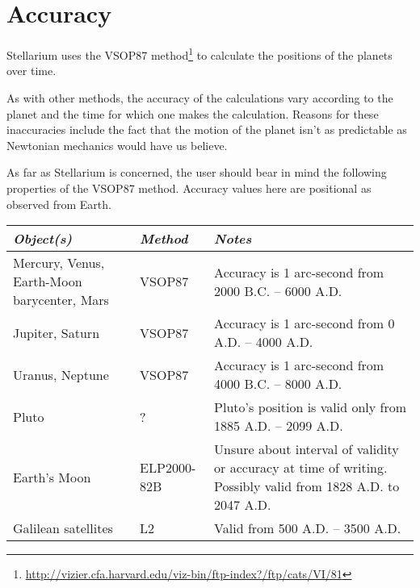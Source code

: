 


\chapter{Accuracy}
\label{ch:Accuracy}
Stellarium uses the VSOP87 \cite{1988A&A...202..309B}
method\footnote{\url{http://vizier.cfa.harvard.edu/viz-bin/ftp-index?/ftp/cats/VI/81}}
to calculate the positions of the planets over time.

As with other methods, the accuracy of the calculations vary according
to the planet and the time for which one makes the calculation. Reasons
for these inaccuracies include the fact that the motion of the planet
isn't as predictable as Newtonian mechanics would have us believe.

As far as Stellarium is concerned, the user should bear in mind the
following properties of the VSOP87 method. Accuracy values here are
positional as observed from Earth.

\begin{longtabu} to \textwidth {X|l|X}
\toprule
\emph{Object(s)} & \emph{Method} & \emph{Notes}\tabularnewline
\midrule
Mercury, Venus, Earth-Moon barycenter, Mars & VSOP87 & Accuracy is 1 arc-second from 2000 B.C. -- 6000 A.D.\\
\midrule
Jupiter, Saturn                             & VSOP87 & Accuracy is 1 arc-second from 0 A.D. -- 4000 A.D.\\
\midrule
Uranus, Neptune                             & VSOP87 & Accuracy is 1 arc-second from 4000 B.C. -- 8000 A.D.\\
\midrule
Pluto                                       & ?      & Pluto's position is valid only from 1885 A.D. -- 2099 A.D.\\
\midrule
Earth's Moon                                & ELP2000-82B & Unsure about interval of validity or accuracy at time of writing. Possibly valid from 1828 A.D. to 2047 A.D.\\
\midrule
Galilean satellites                         & L2     & Valid from 500 A.D. -- 3500 A.D.\\
\bottomrule
\end{longtabu}





